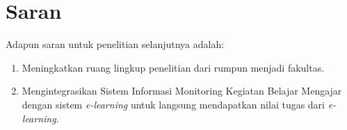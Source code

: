 \section{Saran}
Adapun saran untuk penelitian selanjutnya adalah:
\begin{enumerate} 
	\item Meningkatkan ruang lingkup penelitian dari rumpun menjadi fakultas.
	\item Mengintegrasikan Sistem Informasi Monitoring Kegiatan Belajar Mengajar dengan sistem \textit{e-learning} untuk langsung mendapatkan nilai tugas dari \textit{e-learning}.

\end{enumerate}


\begin{comment}

\end{comment}
